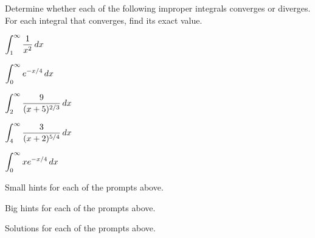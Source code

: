 \begin{activity} \label{A:5.5.2}  Determine whether each of the following improper integrals converges or diverges.  For each integral that converges, find its exact value.
\ba
	\item $\displaystyle \int_1^{\infty} \frac{1}{x^2} \, dx$
	\item $\displaystyle \int_0^{\infty} e^{-x/4} \, dx$
	\item $\displaystyle \int_2^{\infty} \frac{9}{(x+5)^{2/3}} \, dx$
	\item $\displaystyle \int_4^{\infty} \frac{3}{(x+2)^{5/4}} \, dx$
	\item $\displaystyle \int_0^{\infty} x e^{-x/4} \, dx$ 
\ea

\end{activity}
\begin{smallhint}
\ba
	\item Small hints for each of the prompts above.
\ea
\end{smallhint}
\begin{bighint}
\ba
	\item Big hints for each of the prompts above.
\ea
\end{bighint}
\begin{activitySolution}
\ba
	\item Solutions for each of the prompts above.
\ea
\end{activitySolution}
\aftera